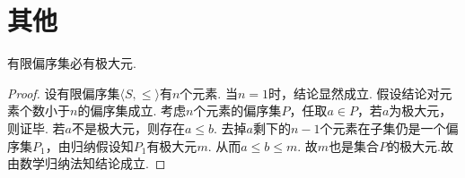 \documentclass[../../main.tex]{subfiles}%
\begin{document}
\section{其他}

\begin{theorem}[有限偏序集必有极大元]\label{theorem:有限偏序集必有极大元}
有限偏序集必有极大元.
\end{theorem}
\begin{proof}
设有限偏序集$\langle S,\leqslant \rangle$有$n$个元素. 当$n=1$时，结论显然成立.
假设结论对元素个数小于$n$的偏序集成立. 考虑$n$个元素的偏序集$P$，任取$a\in P$，若$a$为极大元，则证毕.
若$a$不是极大元，则存在$a\leqslant b$. 去掉$a$剩下的$n-1$个元素在子集仍是一个偏序集$P_1$，由归纳假设知$P_1$有极大元$m$. 从而$a\leqslant b\leqslant m$. 故$m$也是集合$P$的极大元.故由数学归纳法知结论成立.
\end{proof}
\end{document}
